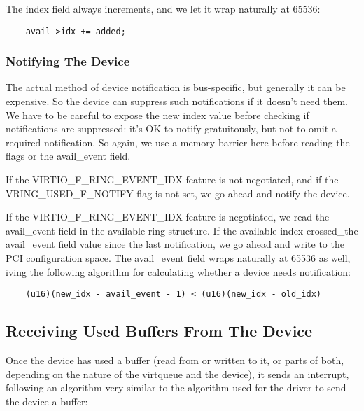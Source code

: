 The index field always increments, and we let it wrap naturally at
65536:

\begin{lstlisting}
	avail->idx += added;
\end{lstlisting}

\subsubsection{Notifying The Device}\label{sec:General Initialization And Device Operation / Device Operation / Supplying Buffers to The Device / Notifying The Device}

The actual method of device notification is bus-specific, but generally
it can be expensive.  So the device can suppress such notifications if it
doesn't need them.  We have to be careful to expose the new index
value before checking if notifications are suppressed: it's OK to notify
gratuitously, but not to omit a required notification. So again,
we use a memory barrier here before reading the flags or the
avail_event field.

If the VIRTIO_F_RING_EVENT_IDX feature is not negotiated, and if the
VRING_USED_F_NOTIFY flag is not set, we go ahead and notify the
device.

If the VIRTIO_F_RING_EVENT_IDX feature is negotiated, we read the
avail_event field in the available ring structure. If the
available index crossed_the avail_event field value since the
last notification, we go ahead and write to the PCI configuration
space.  The avail_event field wraps naturally at 65536 as well,
iving the following algorithm for calculating whether a device needs
notification:

\begin{lstlisting}
	(u16)(new_idx - avail_event - 1) < (u16)(new_idx - old_idx)
\end{lstlisting}

\subsection{Receiving Used Buffers From The Device}\label{sec:General Initialization And Device Operation / Device Operation / Receiving Used Buffers From The Device}

Once the device has used a buffer (read from or written to it, or
parts of both, depending on the nature of the virtqueue and the
device), it sends an interrupt, following an algorithm very
similar to the algorithm used for the driver to send the device a
buffer:

